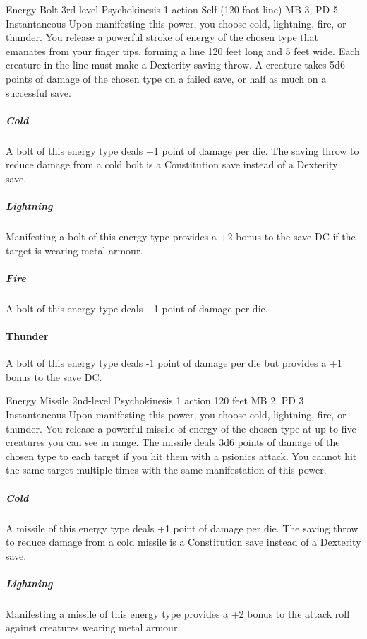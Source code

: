\DndPowerHeader%
  {Energy Bolt}
  {3rd-level Psychokinesis}
  {1 action}
  {Self (120-foot line)}
  {MB 3, PD 5}
  {Instantaneous}
  Upon manifesting this power, you choose cold, lightning,
  fire, or thunder.
  You release a powerful stroke of energy of the chosen type
  that emanates from your finger tips,
  forming a line 120 feet long and 5 feet wide.
  Each creature in the line must make a Dexterity saving throw.
  A creature takes 5d6 points of damage of the chosen type
  on a failed save,
  or half as much on a successful save.
  
  \subparagraph{Cold}
  A bolt of this energy type deals +1 point of damage per die.
  The saving throw to reduce damage from a cold bolt
  is a Constitution save instead of a Dexterity save.
  
  \subparagraph{Lightning}
  Manifesting a bolt of this energy type provides
  a +2 bonus to the save DC if the target is wearing metal armour.
  
  \subparagraph{Fire}
  A bolt of this energy type deals +1 point of damage per die.
  
  \paragraph{Thunder}
  A bolt of this energy type deals -1 point of damage per die
  but provides a +1 bonus to the save DC.

\DndPowerHeader%
  {Energy Missile}
  {2nd-level Psychokinesis}
  {1 action}
  {120 feet}
  {MB 2, PD 3}
  {Instantaneous}
  Upon manifesting this power,
  you choose cold,
  lightning,
  fire,
  or thunder.
  You release a powerful missile of energy
  of the chosen type at up to five creatures you can see in range.
  The missile deals 3d6 points of damage of the chosen type
  to each target if you hit them with a psionics attack.
  You cannot hit the same target multiple times
  with the same manifestation of this power.

  \subparagraph{Cold}
  A missile of this energy type deals +1 point of damage per die.
  The saving throw to reduce damage from a cold missile
  is a Constitution save instead of a Dexterity save.
  
  \subparagraph{Lightning}
  Manifesting a missile of this energy type provides
  a +2 bonus to the attack roll against creatures wearing metal armour.
  
